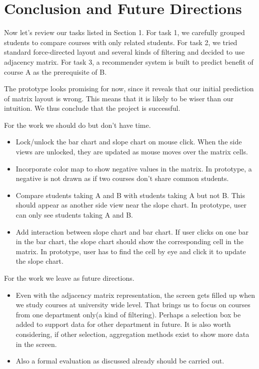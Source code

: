 \section{Conclusion and Future Directions}
\label{sec:conclusion}

Now let's review our tasks listed in Section 1. For task 1, we carefully grouped students to compare courses with only related students. For task 2, we tried standard force-directed layout and several kinds of filtering and decided to use adjacency matrix. For task 3, a recommender system is built to predict benefit of course A as the prerequisite of B.

The prototype looks promising for now, since it reveals that our initial prediction of matrix layout is wrong. This means that it is likely to be wiser than our intuition. We thus conclude that the project is successful. 

For the work we should do but don't have time.
\begin{itemize}
\item Lock/unlock the bar chart and slope chart on mouse click. When the side views are unlocked, they are updated as mouse moves over the matrix cells.

\item Incorporate color map to show negative values in the matrix. In prototype, a negative is not drawn as if two courses don't share common students.

\item Compare students taking A and B with students taking A but not B. This should appear as another side view near the slope chart. In prototype, user can only see students taking A and B.

\item Add interaction between slope chart and bar chart. If user clicks on one bar in the bar chart, the slope chart should show the corresponding cell in the matrix. In prototype, user has to find the cell by eye and click it to update the slope chart.
\end{itemize}
For the work we leave as future directions.
\begin{itemize}
\item Even with the adjacency matrix representation, the screen gets filled up when we study courses at university wide level. That brings us to focus on courses from one department only(a kind of filtering). Perhaps a selection box be added to support data for other department in future. It is also worth considering, if other selection, aggregation methods exist to show more data in the screen.

\item Also a formal evaluation as discussed already should be carried out. 
\end{itemize}
